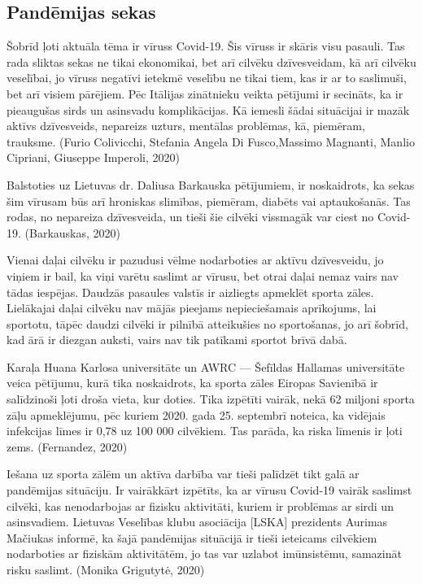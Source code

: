 \documentclass[12pt]{article}
\begin{document}
\subsection{Pandēmijas sekas}
Šobrīd ļoti aktuāla tēma ir vīruss Covid-19. Šis vīruss ir skāris visu pasauli. Tas rada sliktas sekas ne tikai ekonomikai, bet arī cilvēku dzīvesveidam, kā arī cilvēku veselībai, jo vīruss negatīvi ietekmē veselību ne tikai tiem, kas ir ar to saslimuši, bet arī visiem pārējiem. Pēc Itālijas zinātnieku veikta pētījumi ir secināts, ka ir pieaugušas sirds un asinsvadu komplikācijas. Kā iemesli šādai situācijai ir mazāk aktīvs dzīvesveids, nepareizs uzturs, mentālas problēmas, kā, piemēram, trauksme. (Furio Colivicchi, Stefania Angela Di Fusco,Massimo Magnanti, Manlio Cipriani, Giuseppe Imperoli, 2020)\par
Balstoties uz Lietuvas dr. Daliusa Barkauska pētījumiem, ir noskaidrots, ka sekas šim vīrusam būs arī hroniskas slimības, piemēram, diabēts vai aptaukošanās. Tas rodas, no nepareiza dzīvesveida, un tieši šie cilvēki vissmagāk var ciest no Covid-19. (Barkauskas, 2020) \par
Vienai daļai cilvēku ir pazudusi vēlme nodarboties ar aktīvu dzīvesveidu, jo viņiem ir bail, ka viņi varētu saslimt ar vīrusu, bet otrai daļai nemaz vairs nav tādas iespējas. Daudzās pasaules valstīs ir aizliegts apmeklēt sporta zāles. Lielākajai daļai cilvēku nav mājās pieejams nepieciešamais aprīkojums, lai sportotu, tāpēc daudzi cilvēki ir pilnībā atteikušies no sportošanas, jo arī šobrīd, kad ārā ir diezgan auksti, vairs nav tik patīkami sportot brīvā dabā. \par
Karaļa Huana Karlosa universitāte un AWRC — Šefīldas Hallamas universitāte veica pētījumu, kurā tika noskaidrots, ka sporta zāles Eiropas Savienībā ir salīdzinoši ļoti droša vieta, kur doties. Tika izpētīti vairāk, nekā 62 miljoni sporta zāļu apmeklējumu, pēc kuriem 2020. gada 25. septembrī noteica, ka vidējais infekcijas līmes ir 0,78 uz 100 000 cilvēkiem. Tas parāda, ka riska līmenis ir ļoti zems. (Fernandez, 2020) \par
Iešana uz sporta zālēm un aktīva darbība var tieši palīdzēt tikt galā ar pandēmijas situāciju. Ir vairākkārt izpētīts, ka ar vīrusu Covid-19 vairāk saslimst cilvēki, kas nenodarbojas ar fizisku aktivitāti, kuriem ir problēmas ar sirdi un asinsvadiem.  
Lietuvas Veselības klubu asociācija [LSKA] prezidents Aurimas Mačiukas informē, ka šajā pandēmijas situācijā ir tieši ieteicams cilvēkiem nodarboties ar fiziskām aktivitātēm, jo tas var uzlabot imūnsistēmu, samazināt risku saslimt. 
  (Monika Grigutytė, 2020)
\end{document}
